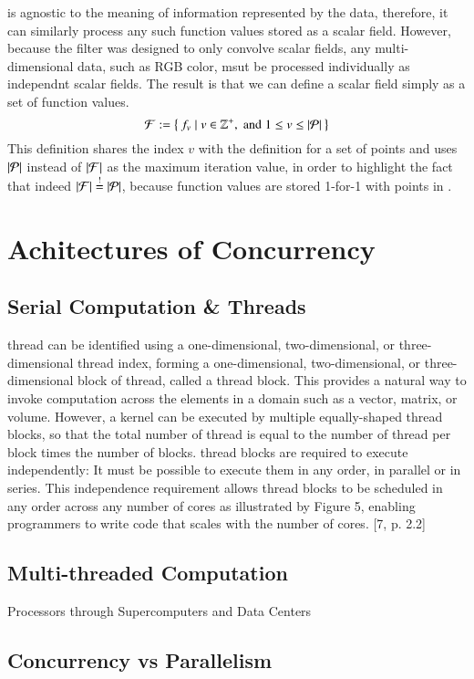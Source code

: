  is agnostic to the meaning of information represented by the data, therefore, it can similarly process any such function values stored as a scalar field. However, because the filter was designed to only convolve scalar fields, any multi-dimensional data, such as RGB color, msut be processed individually as independnt scalar fields. The result is that we can define a scalar field simply as a set of function values.
%
\begin{equation}
	\mathcal{F} := \left \{\: f_v \mid v \in \mathbb{Z}^+, \;\text{and}\; 1\leq v \leq|\mathcal{P}| \:\right \}
	\label{eq:defineSetOfFunctionValues}
\end{equation}
%
This definition shares the index $v$ with the definition for a set of points and uses $|\mathcal{P}|$ instead of $|\mathcal{F}|$ as the maximum iteration value, in order to highlight the fact that indeed $|\mathcal{F}| \overset{!}{=} |\mathcal{P}|$, because function values are stored 1-for-1 with points in \tdd{}.
%
%
%
%
\section{Achitectures of Concurrency}
%
\subsection{Serial Computation \& Threads}
thread can be identified using a one-dimensional, two-dimensional, or three-
dimensional thread index, forming a one-dimensional, two-dimensional, or three-
dimensional block of thread, called a thread block. This provides a natural way
to invoke computation across the elements in a domain such as a vector, matrix,
or volume. However, a kernel can be executed by multiple equally-shaped thread
blocks, so that the total number of thread is equal to the number of thread
per block times the number of blocks. thread blocks are required to execute
independently: It must be possible to execute them in any order, in parallel or
in series. This independence requirement allows thread blocks to be scheduled
in any order across any number of cores as illustrated by Figure 5, enabling
programmers to write code that scales with the number of cores. [7, p. 2.2]
%
\subsection{Multi-threaded Computation}
Processors through Supercomputers and Data Centers
%
\subsection{Concurrency vs Parallelism}
%
